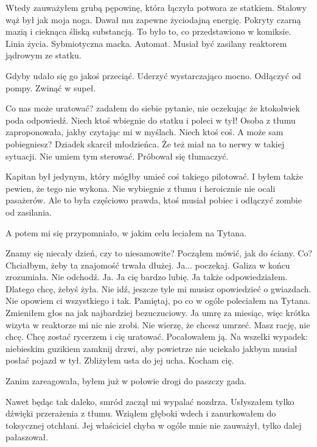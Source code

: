 Wtedy zauważyłem grubą pępowinę, która łączyła potwora ze statkiem.
Stalowy wąż był jak moja noga. Dawał mu zapewne życiodajną energię.
Pokryty czarną mazią i cieknąca śliską substancją.
To było to, co przedstawiono w komiksie.
Linia życia. Sybmiotyczna macka. Automat. Musiał być zasilany reaktorem jądrowym ze statku.

Gdyby udało się go jakoś przeciąć.
Uderzyć wystarczająco mocno.
Odłączyć od pompy.
Zwinąć w supeł.

\begin{dialogue}
	\ds{} Co nas może uratować? \dm{} zadałem do siebie pytanie, nie oczekując że ktokolwiek poda odpowiedź.
	\ds{} Niech ktoś wbiegnie do statku i poleci w tył! \dm{} Osoba z tłumu zaproponowała, jakby czytając mi w myślach. \dm{} Niech ktoś coś.
	\ds{} A może sam pobiegniesz? \dm{} Dziadek skarcił młodzieńca. Że też miał na to nerwy w takiej sytuacji.
	\ds{} Nie umiem tym sterować. \dm{} Próbował się tłumaczyć.
\end{dialogue}

Kapitan był jedynym, który mógłby umieć coś takiego pilotować.
I byłem także pewien, że tego nie wykona.
Nie wybiegnie z tłumu i heroicznie nie ocali pasażerów.
Ale to była częściowo prawda, ktoś musiał pobiec i odłączyć zombie od zasilania. 

A potem mi się przypomniało, w jakim celu leciałem na Tytana.
\begin{dialogue}
	\ds{} Znamy się niecały dzień, czy to niesamowite? \dm{} Począłem mówić, jak do ściany.
	\ds{} Co?
	\ds{} Chciałbym, żeby ta znajomość trwała dłużej.
	\ds{} Ja... poczekaj. \dm{} Galiza w końcu zrozumiała. \dm{} Nie odchodź. Ja. Ja cię bardzo lubię.
	\ds{} Ja także \dm{} odpowiedziałem. \dm{} Dlatego chcę, żebyś żyła.
	\ds{} Nie idź, jeszcze tyle mi musisz opowiedzieć o gwiazdach.
	\ds{} Nie opowiem ci wszystkiego i tak. Pamiętaj, po co w ogóle poleciałem na Tytana. \dm{} Zmieniłem głos na jak najbardziej bezuczuciowy. \dm{} Ja umrę za miesiąc, więc krótka wizyta w reaktorze mi nic nie zrobi.
	\ds{} Nie wierzę, że chcesz umrzeć.
	\ds{} Masz rację, nie chcę. Chcę zostać rycerzem i cię uratować. \dm{} Pocałowałem ją. \dm{} Na wszelki wypadek: niebieskim guzikiem zamknij drzwi, aby powietrze nie uciekało jakbym musiał posłać pojazd w tył. \dm{} Zbliżyłem usta do jej ucha. \dm{} Kocham cię.
\end{dialogue}

Zanim zareagowała, byłem już w połowie drogi do paszczy gada.

Nawet będąc tak daleko, smród zaczął mi wypalać nozdrza.
Usłyszałem tylko dźwięki przerażenia z tłumu.
Wziąłem głęboki wdech i zanurkowałem do toksycznej otchłani.
Jej właściciel chyba w ogóle mnie nie zauważył, tylko dalej pałaszował.

